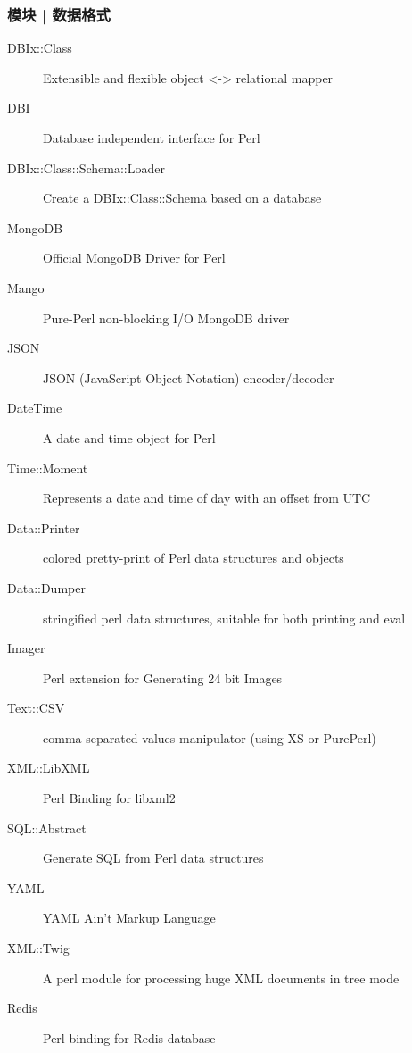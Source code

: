 \begin{frame}
  \frametitle{模块 | 数据格式}
  {\footnotesize
    \begin{description}
      \item[DBIx::Class] Extensible and flexible object <-> relational mapper
      \item[DBI] Database independent interface for Perl 
      \item[DBIx::Class::Schema::Loader] Create a DBIx::Class::Schema based on a database
      \item[MongoDB] Official MongoDB Driver for Perl
      \item[Mango] Pure-Perl non-blocking I/O MongoDB driver
      \item[JSON] JSON (JavaScript Object Notation) encoder/decoder
      \item[DateTime] A date and time object for Perl 
      \item[Time::Moment] Represents a date and time of day with an offset from UTC
      \item[Data::Printer] colored pretty-print of Perl data structures and objects
      \item[Data::Dumper] stringified perl data structures, suitable for both printing and eval
      \item[Imager] Perl extension for Generating 24 bit Images
      \item[Text::CSV] comma-separated values manipulator (using XS or PurePerl)
      \item[XML::LibXML] Perl Binding for libxml2
      \item[SQL::Abstract] Generate SQL from Perl data structures
      \item[YAML] YAML Ain't Markup Language\texttrademark
      \item[XML::Twig] A perl module for processing huge XML documents in tree mode
      \item[Redis] Perl binding for Redis database
    \end{description}
}
\end{frame}

